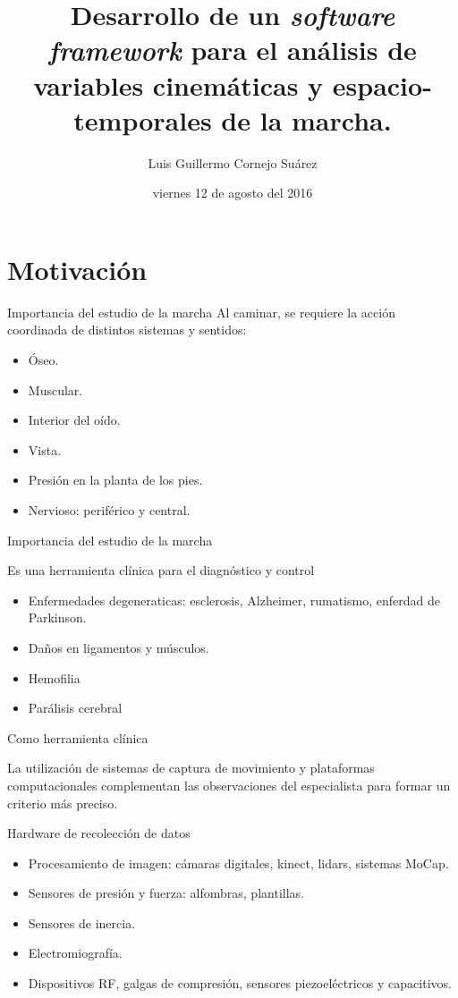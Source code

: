 \documentclass{beamer} %
\author{Luis Guillermo Cornejo Suárez}
\institute[UCR]{Universidad de Costa Rica}
\title[PRIS-Lab Motion analysis Software]{Desarrollo de un \emph{software framework} para el análisis de variables cinemáticas y espacio-temporales de la marcha.}
\date{viernes 12 de agosto del 2016}
\begin{document}
\begin{frame}
    \titlepage
\end{frame}

\section{Motivación}

\begin{frame}{Importancia del estudio de la marcha}
    Al caminar, se requiere la acción coordinada de distintos sistemas y sentidos:
    \begin{itemize}
        \item Óseo.
        \item Muscular.
        \item Interior del oído.
        \item Vista.
        \item Presión en la planta de los pies. 
        \item Nervioso: periférico y central.
    \end{itemize}
\end{frame}

\begin{frame}{Importancia del estudio de la marcha}
    \begin{block}{}
        Es una herramienta clínica para el diagnóstico y control
    \end{block}
    \begin{itemize}
        \item Enfermedades degeneraticas: esclerosis, Alzheimer, rumatismo, enferdad de Parkinson.
        \item Daños en ligamentos y músculos.
        \item Hemofilia
        \item Parálisis cerebral
    \end{itemize}
\end{frame}

\begin{frame}{Como herramienta clínica}
    \begin{block}{}
        La utilización de sistemas de captura de movimiento y plataformas computacionales complementan las observaciones del especialista para formar un criterio más preciso. 
    \end{block}
\end{frame}

\begin{frame}{Hardware de recolección de datos}
    \begin{itemize}
         \item Procesamiento de imagen: cámaras digitales, kinect, lidars, sistemas MoCap.
        \item Sensores de presión y fuerza: alfombras, plantillas.
        \item Sensores de inercia.
        \item Electromiografía.
        \item Dispositivos RF, galgas de compresión, sensores piezoeléctricos y capacitivos.   
    \end{itemize}
\end{frame}
\end{document}
